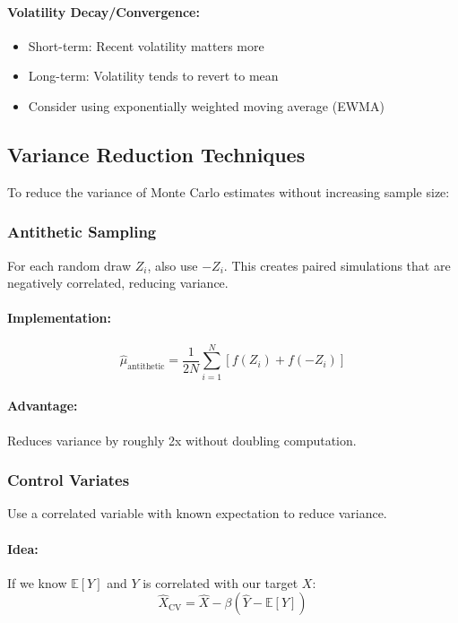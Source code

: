 \documentclass[12pt,a4paper]{article}
\begin{document}
\paragraph{Volatility Decay/Convergence:}
\begin{itemize}
    \item Short-term: Recent volatility matters more
    \item Long-term: Volatility tends to revert to mean
    \item Consider using exponentially weighted moving average (EWMA)
\end{itemize}

\subsection{Variance Reduction Techniques}

To reduce the variance of Monte Carlo estimates without increasing sample size:

\subsubsection{Antithetic Sampling}

For each random draw $Z_i$, also use $-Z_i$. This creates paired simulations that are negatively correlated, reducing variance.

\paragraph{Implementation:}
\begin{equation}
\hat{\mu}_{\text{antithetic}} = \frac{1}{2N} \sum_{i=1}^{N} \left[ f(Z_i) + f(-Z_i) \right]
\end{equation}

\paragraph{Advantage:} Reduces variance by roughly 2x without doubling computation.

\subsubsection{Control Variates}

Use a correlated variable with known expectation to reduce variance.

\paragraph{Idea:} If we know $\mathbb{E}[Y]$ and $Y$ is correlated with our target $X$:
\begin{equation}
\hat{X}_{\text{CV}} = \hat{X} - \beta(\hat{Y} - \mathbb{E}[Y])
\end{equation}
\end{document}
